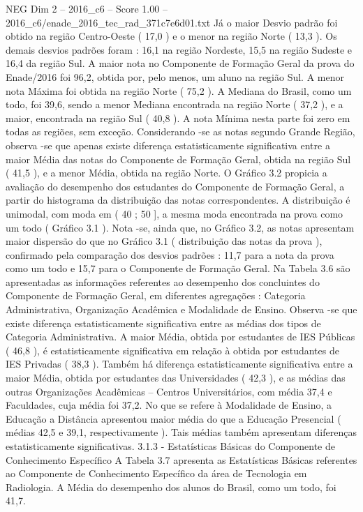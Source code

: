 \begin{textsample}{NEG Dim 2 – 2016\_c6 – Score 1.00 – 2016\_c6/enade\_2016\_tec\_rad\_371c7e6d01.txt}
Já o maior Desvio padrão foi obtido na região Centro-Oeste ( 17,0 ) e o menor na região Norte ( 13,3 ).
Os demais desvios padrões foram : 16,1 na região Nordeste, 15,5 na região Sudeste e 16,4 da região Sul.
A maior nota no Componente de Formação Geral da prova do Enade/2016 foi 96,2, obtida por, pelo menos, um aluno na região Sul.
A menor nota Máxima foi obtida na região Norte ( 75,2 ).
A Mediana do Brasil, como um todo, foi 39,6, sendo a menor Mediana encontrada na região Norte ( 37,2 ), e a maior, encontrada na região Sul ( 40,8 ).
A nota Mínima nesta parte foi zero em todas as regiões, sem exceção.
Considerando -se as notas segundo Grande Região, observa -se que apenas existe diferença estatisticamente significativa entre a maior Média das notas do Componente de Formação Geral, obtida na região Sul ( 41,5 ), e a menor Média, obtida na região Norte.
O Gráfico 3.2 propicia a avaliação do desempenho dos estudantes do Componente de Formação Geral, a partir do histograma da distribuição das notas correspondentes.
A distribuição é unimodal, com moda em ( 40 ; 50 ], a mesma moda encontrada na prova como um todo ( Gráfico 3.1 ).
Nota -se, ainda que, no Gráfico 3.2, as notas apresentam maior dispersão do que no Gráfico 3.1 ( distribuição das notas da prova ), confirmado pela comparação dos desvios padrões : 11,7 para a nota da prova como um todo e 15,7 para o Componente de Formação Geral.
Na Tabela 3.6 são apresentadas as informações referentes ao desempenho dos concluintes do Componente de Formação Geral, em diferentes agregações : Categoria Administrativa, Organização Acadêmica e Modalidade de Ensino.
Observa -se que existe diferença estatisticamente significativa entre as médias dos tipos de Categoria Administrativa.
A maior Média, obtida por estudantes de IES Públicas ( 46,8 ), é estatisticamente significativa em relação à obtida por estudantes de IES Privadas ( 38,3 ).
Também há diferença estatisticamente significativa entre a maior Média, obtida por estudantes das Universidades ( 42,3 ), e as médias das outras Organizações Acadêmicas – Centros Universitários, com média 37,4 e Faculdades, cuja média foi 37,2.
No que se refere à Modalidade de Ensino, a Educação a Distância apresentou maior média do que a Educação Presencial ( médias 42,5 e 39,1, respectivamente ).
Tais médias também apresentam diferenças estatisticamente significativas. 3.1.3 - Estatísticas Básicas do Componente de Conhecimento Específico A Tabela 3.7 apresenta as Estatísticas Básicas referentes ao Componente de Conhecimento Específico da área de Tecnologia em Radiologia.
A Média do desempenho dos alunos do Brasil, como um todo, foi 41,7.

\end{textsample}
